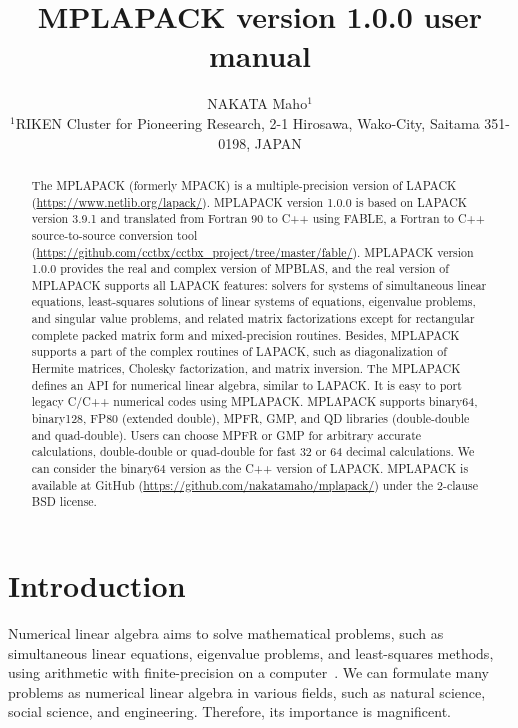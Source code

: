 \documentclass[12pt]{article}
\begin{document}
  
  \title{\sf MPLAPACK version 1.0.0 user manual}
  \author{NAKATA Maho$^1$\\
  \normalsize
  $^1$RIKEN Cluster for Pioneering Research, 2-1 Hirosawa, Wako-City, Saitama 351-0198, JAPAN}

\date{}

\maketitle

\begin{abstract}
The MPLAPACK (formerly MPACK) is a multiple-precision version of LAPACK \\
(\url{https://www.netlib.org/lapack/}).
MPLAPACK version 1.0.0 is based on LAPACK version 3.9.1 and translated from Fortran 90 to C++ using FABLE, a Fortran to C++ source-to-source conversion tool (\url{https://github.com/cctbx/cctbx\_project/tree/master/fable/}). 
MPLAPACK version 1.0.0 provides the real and complex version of MPBLAS, and the real version of MPLAPACK supports all LAPACK features: solvers for systems of simultaneous linear equations, least-squares solutions of linear systems of equations, eigenvalue problems, and singular value problems, and related matrix factorizations except for rectangular complete packed matrix form and mixed-precision routines. Besides, MPLAPACK supports a part of the complex routines of LAPACK, such as diagonalization of Hermite matrices, Cholesky factorization, and matrix inversion. The MPLAPACK defines an API for numerical linear algebra, similar to LAPACK. It is easy to port legacy C/C++ numerical codes using MPLAPACK. MPLAPACK supports binary64, binary128, FP80 (extended double), MPFR, GMP, and QD libraries (double-double and quad-double). Users can choose MPFR or GMP for arbitrary accurate calculations, double-double or quad-double for fast 32 or 64 decimal calculations. We can consider the binary64 version as the C++ version of LAPACK. MPLAPACK is available at GitHub (\url{https://github.com/nakatamaho/mplapack/}) under the 2-clause BSD license.
\end{abstract}

\section{Introduction}

Numerical linear algebra aims to solve mathematical problems, such as simultaneous linear equations, eigenvalue problems, and least-squares methods, using arithmetic with finite-precision on a computer~\cite{GoluVanl96}. We can formulate many problems as numerical linear algebra in various fields, such as natural science, social science, and engineering. Therefore, its importance is magnificent. 
\end{document}
